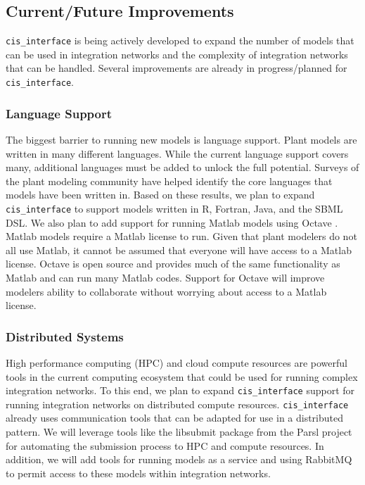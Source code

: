 \documentclass[journal]{IEEEtran}
\newcommand{\cis}{{\tt cis\_interface}{}}
\begin{document}
\subsection{Current/Future Improvements}\label{SS:future}
%
{\cis} is being actively developed to expand the number of models 
that can be used in integration networks and the complexity of integration 
networks that can be handled. Several improvements are already in progress/planned for {\cis}.

\subsubsection{Language Support}\label{SS:langsupport}
%
The biggest barrier to running new models is language support. Plant models 
are written in many different languages. While the current language support 
covers many, additional languages must be added to unlock the full potential. 
Surveys of the plant modeling community have helped identify the core languages 
that models have been written in. Based on these results, we plan to expand 
{\cis} to support models written in R, Fortran, Java, and the SBML \citep{Hucka2003} DSL.
We also plan to add support for running Matlab models using Octave \citep{Eaton2002}. Matlab 
models require a Matlab license to run. Given that plant modelers do not all 
use Matlab, it cannot be assumed that everyone will have access to a Matlab 
license. Octave is open source and provides much of the same functionality 
as Matlab and can run many Matlab codes. Support for Octave will improve 
modelers ability to collaborate without worrying about access to a Matlab 
license. 

\subsubsection{Distributed Systems}\label{SS:distributed}
%
High performance computing (HPC) and cloud compute resources are powerful 
tools in the current computing ecosystem that could be used for running 
complex integration networks. To this end, we plan to expand {\cis} 
support for running integration networks on distributed compute resources. 
{\cis} already uses communication tools that can be adapted for use 
in a distributed pattern. We will leverage tools like the libsubmit package from the 
Parsl project \citep{babuji18} for 
automating the submission process to HPC and compute resources. In addition, 
we will add tools for running models as a service and using RabbitMQ to 
permit access to these models within integration networks.
\end{document}
